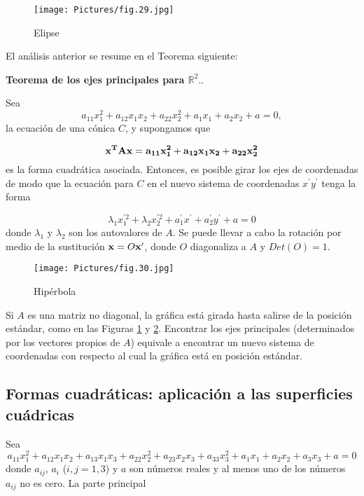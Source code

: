 \begin{figure}
    \centering
    \texttt{[image: Pictures/fig.29.jpg]}
    \caption{Elipse}
    \label{Elipse}
\end{figure} 

  \bigskip
  
 El análisis anterior se resume en el Teorema siguiente:
 
 \bigskip
 
 \begin{corollary}\textbf{Teorema de los ejes principales para $\mathbb{R}^2$}..
 
 Sea 
 \begin{equation}
a_{11}x_1^{2}+a_{12}x_1x_2+a_{22}x_2^{2}+ a_1 x_1 + a_2 x_2 + a = 0, 
\end{equation}
\noindent
la ecuación de una cónica $C$, y supongamos que 
 
 $$\bf{x} ^T A \bf{x}=a_{11}x_1^{2}+a_{12}x_1x_2+a_{22}x_2^{2}$$
 es la forma cuadrática asociada. Entonces, es posible  girar los ejes de coordenadas de modo que la ecuación para $C$ en el nuevo sistema de coordenadas $x^{\prime}y^{\prime}$ tenga la forma  
 
 $$\lambda_1x^{\prime 2}_1+\lambda_2x^{\prime 2}_2  +a_1^{\prime}x^{\prime}+ a_2^{\prime}y^{\prime} +a  =0$$
 \noindent
 donde $\lambda_1$   y  $\lambda_2$  son los autovalores de $A$. Se puede llevar a cabo la rotación por medio de la sustitución $\bold x=O \bold x^{\prime}$, donde $O$ diagonaliza a $A$ y $Det(O)=1$.
 \end{corollary}

 


\begin{figure}
    \centering
    \texttt{[image: Pictures/fig.30.jpg]}
    \caption{Hipérbola}
    \label{Hipérbola}
\end{figure} 

Si $A$ es una matriz no diagonal, la gráfica   está girada hasta salirse de la posición estándar, como en las Figuras  \ref{Elipse} y \ref{Hipérbola}.
Encontrar los ejes principales (determinados por los vectores propios de $A$) equivale a
encontrar un nuevo sistema de coordenadas con respecto al cual la gráfica está en posición
estándar.

\bigskip

\subsection{Formas cuadráticas: aplicación a las superficies cuádricas}
Sea
\begin{equation}
a_{11}x_1^{2}+a_{12}x_1 x_2+a_{13}x_1 x_3+a_{22}x_2^{2}+a_{23}x_2 x_3+a_{33}x_3^{2}+ a_1 x_1 + a_2 x_2+ a_3 x_3  + a = 0 \label{fcuadratica33}
\end{equation}
donde $a_{ij}$, $a_i$ ($i,j=1,3$) y $a$ son números reales  y al menos uno de los números $a_{ij}$ no es cero.
La parte principal

